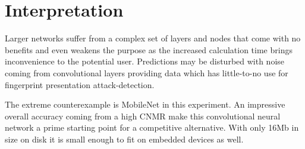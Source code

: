 \section{Interpretation}
Larger networks suffer from a complex set of layers and nodes that come with no benefits and even weakens the purpose as the increased calculation time brings inconvenience to the potential user.
Predictions may be disturbed with noise coming from convolutional layers providing data which has little-to-no use for fingerprint presentation attack-detection.

The extreme counterexample is MobileNet in this experiment.
An impressive overall accuracy coming from a high CNMR make this convolutional neural network a prime starting point for a competitive alternative.
With only 16Mb in size on disk it is small enough to fit on embedded devices as well.
